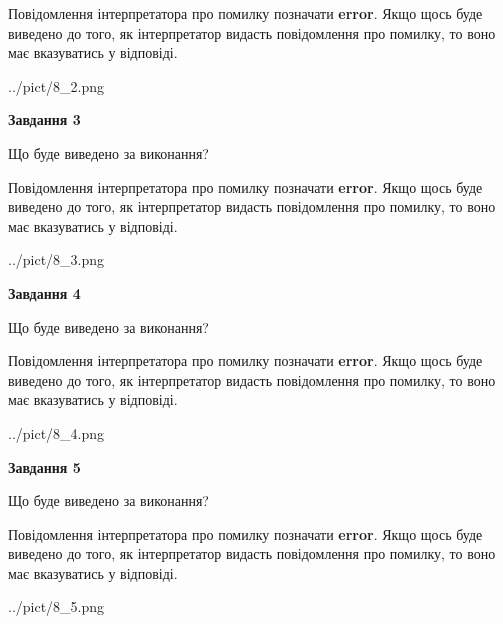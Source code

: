 \documentclass[12pt, ukrainian]{article}
\begin{document}
{\begin {large}
Повідомлення інтерпретатора про помилку позначати \textbf{error}.
Якщо щось буде виведено до того, як інтерпретатор видасть повідомлення про помилку, 
то воно має вказуватись у відповіді. \par


\begin{center}
	{../pict/8_2.png}
\end{center}
\newpage

{\begin {center}\textbf{Завдання 3}\end {center}}\par
Що буде виведено за виконання?

Повідомлення інтерпретатора про помилку позначати \textbf{error}.
Якщо щось буде виведено до того, як інтерпретатор видасть повідомлення про помилку, 
то воно має вказуватись у відповіді. \par


\begin{center}
	{../pict/8_3.png}
\end{center}
\newpage

{\begin {center}\textbf{Завдання 4}\end {center}}\par
Що буде виведено за виконання?

Повідомлення інтерпретатора про помилку позначати \textbf{error}.
Якщо щось буде виведено до того, як інтерпретатор видасть повідомлення про помилку, 
то воно має вказуватись у відповіді. \par


\begin{center}
	{../pict/8_4.png}
\end{center}
\newpage

{\begin {center}\textbf{Завдання 5}\end {center}}\par
Що буде виведено за виконання?

Повідомлення інтерпретатора про помилку позначати \textbf{error}.
Якщо щось буде виведено до того, як інтерпретатор видасть повідомлення про помилку, 
то воно має вказуватись у відповіді. \par


\begin{center}
	{../pict/8_5.png}
\end{center}
\newpage


\end{large}}
\end{document}
